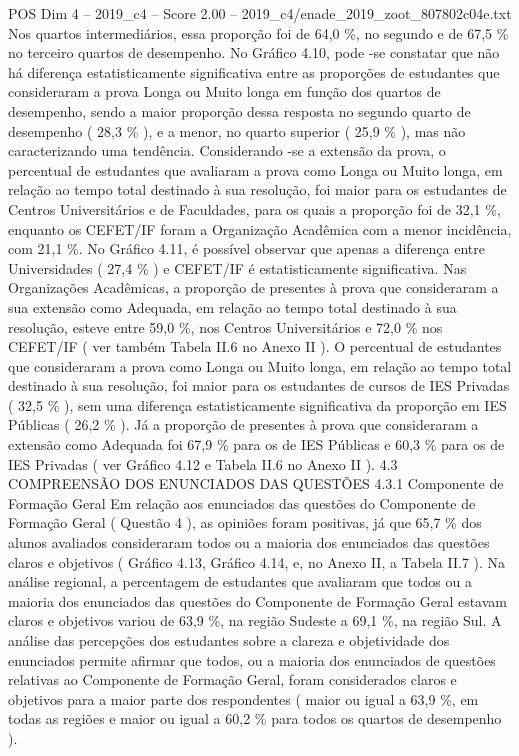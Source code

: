 \begin{textsample}{POS Dim 4 – 2019\_c4 – Score 2.00 – 2019\_c4/enade\_2019\_zoot\_807802c04e.txt}
Nos quartos intermediários, essa proporção foi de 64,0 \%, no segundo e de 67,5 \% no terceiro quartos de desempenho.
No Gráfico 4.10, pode -se constatar que não há diferença estatisticamente significativa entre as proporções de estudantes que consideraram a prova Longa ou Muito longa em função dos quartos de desempenho, sendo a maior proporção dessa resposta no segundo quarto de desempenho ( 28,3 \% ), e a menor, no quarto superior ( 25,9 \% ), mas não caracterizando uma tendência.
Considerando -se a extensão da prova, o percentual de estudantes que avaliaram a prova como Longa ou Muito longa, em relação ao tempo total destinado à sua resolução, foi maior para os estudantes de Centros Universitários e de Faculdades, para os quais a proporção foi de 32,1 \%, enquanto os CEFET/IF foram a Organização Acadêmica com a menor incidência, com 21,1 \%.
No Gráfico 4.11, é possível observar que apenas a diferença entre Universidades ( 27,4 \% ) e CEFET/IF é estatisticamente significativa.
Nas Organizações Acadêmicas, a proporção de presentes à prova que consideraram a sua extensão como Adequada, em relação ao tempo total destinado à sua resolução, esteve entre 59,0 \%, nos Centros Universitários e 72,0 \% nos CEFET/IF ( ver também Tabela II.6 no Anexo II ).
O percentual de estudantes que consideraram a prova como Longa ou Muito longa, em relação ao tempo total destinado à sua resolução, foi maior para os estudantes de cursos de IES Privadas ( 32,5 \% ), sem uma diferença estatisticamente significativa da proporção em IES Públicas ( 26,2 \% ).
Já a proporção de presentes à prova que consideraram a extensão como Adequada foi 67,9 \% para os de IES Públicas e 60,3 \% para os de IES Privadas ( ver Gráfico 4.12 e Tabela II.6 no Anexo II ). 4.3 COMPREENSÃO DOS ENUNCIADOS DAS QUESTÕES 4.3.1 Componente de Formação Geral Em relação aos enunciados das questões do Componente de Formação Geral ( Questão 4 ), as opiniões foram positivas, já que 65,7 \% dos alunos avaliados consideraram todos ou a maioria dos enunciados das questões claros e objetivos ( Gráfico 4.13, Gráfico 4.14, e, no Anexo II, a Tabela II.7 ).
Na análise regional, a percentagem de estudantes que avaliaram que todos ou a maioria dos enunciados das questões do Componente de Formação Geral estavam claros e objetivos variou de 63,9 \%, na região Sudeste a 69,1 \%, na região Sul.
A análise das percepções dos estudantes sobre a clareza e objetividade dos enunciados permite afirmar que todos, ou a maioria dos enunciados de questões relativas ao Componente de Formação Geral, foram considerados claros e objetivos para a maior parte dos respondentes ( maior ou igual a 63,9 \%, em todas as regiões e maior ou igual a 60,2 \% para todos os quartos de desempenho ).

\end{textsample}
